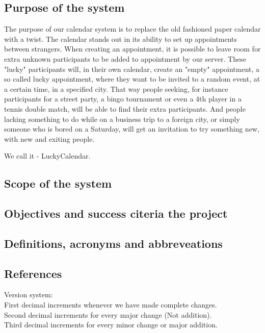 \subsection{Purpose of the system}
		The purpose of our calendar system is to replace the old fashioned paper calendar with a twist. The calendar stands out in its ability to set up appointments between strangers. When creating an appointment, it is possible to leave room for extra unknown participants to be added to appointment by our server. These "lucky" participants will, in their own calendar, create an "empty" appointment, a so called lucky appointment, where they want to be invited to a random event, at a certain time, in a specified city. That way people seeking, for instance participants for a street party, a bingo tournament or even a 4th player in a tennis double match, will be able to find their extra participants. And people lacking something to do while on a business trip to a foreign city, or simply someone who is bored on a Saturday, will get an invitation to try something new, with new and exiting people.

		We call it - LuckyCalendar.

\subsection{Scope of the system}

\subsection{Objectives and success citeria the project}

\subsection{Definitions, acronyms and abbreveations}

\subsection{References}


Version system:\\
First decimal increments whenever we have made complete changes. \\
Second decimal increments for every major change (Not addition).   \\
Third decimal increments for every minor change or major addition.\\

